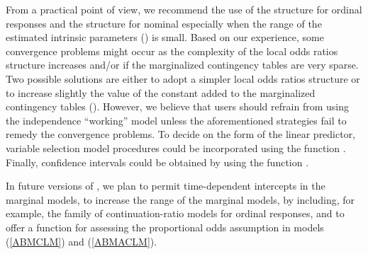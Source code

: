 \documentclass[
]{jss}
\begin{document}
From a practical point of view, we recommend the use of the
 structure for ordinal responses and the
 structure for nominal especially when the range of
the estimated intrinsic parameters () is small.
Based on our experience, some convergence problems might occur as the
complexity of the local odds ratios structure increases and/or if the
marginalized contingency tables are very sparse. Two possible solutions
are either to adopt a simpler local odds ratios structure or to increase
slightly the value of the constant added to the marginalized contingency
tables (). However, we believe that users should refrain from
using the independence ``working'' model unless the aforementioned
strategies fail to remedy the convergence problems. To decide on the
form of the linear predictor, variable selection model procedures could
be incorporated using the function . Finally, confidence
intervals could be obtained by using the function .

In future versions of , we plan to permit time-dependent
intercepts in the marginal models, to increase the range of the marginal
models, by including, for example, the family of continuation-ratio
models for ordinal responses, and to offer a function for assessing the
proportional odds assumption in models (\ref{ABMCLM}) and
(\ref{ABMACLM}).


\end{document}
